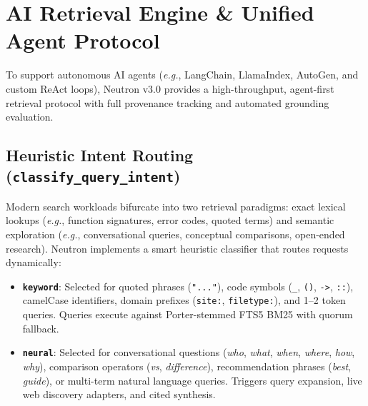 \documentclass[10pt,a4paper]{article}
\begin{document}
\section{AI Retrieval Engine \& Unified Agent Protocol}

To support autonomous AI agents (\textit{e.g.}, LangChain, LlamaIndex, AutoGen, and custom ReAct loops), Neutron v3.0 provides a high-throughput, agent-first retrieval protocol with full provenance tracking and automated grounding evaluation.

\subsection{Heuristic Intent Routing (\texttt{classify\_query\_intent})}
Modern search workloads bifurcate into two retrieval paradigms: exact lexical lookups (\textit{e.g.}, function signatures, error codes, quoted terms) and semantic exploration (\textit{e.g.}, conversational queries, conceptual comparisons, open-ended research). Neutron implements a smart heuristic classifier that routes requests dynamically:
\begin{itemize}
    \item \textbf{\texttt{keyword}}: Selected for quoted phrases (\texttt{"..."}), code symbols (\texttt{\_}, \texttt{()}, \texttt{->}, \texttt{::}), camelCase identifiers, domain prefixes (\texttt{site:}, \texttt{filetype:}), and 1--2 token queries. Queries execute against Porter-stemmed FTS5 BM25 with quorum fallback.
    \item \textbf{\texttt{neural}}: Selected for conversational questions (\textit{who}, \textit{what}, \textit{when}, \textit{where}, \textit{how}, \textit{why}), comparison operators (\textit{vs}, \textit{difference}), recommendation phrases (\textit{best}, \textit{guide}), or multi-term natural language queries. Triggers query expansion, live web discovery adapters, and cited synthesis.
\end{itemize}
\end{document}
